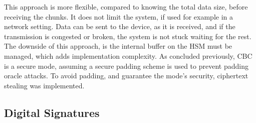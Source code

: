 This approach is more flexible, compared to knowing the total data size, before receiving the chunks. It does not limit the system, if used for example in a network setting. Data can be sent to the device, as it is received, and if the transmission is congested or broken, the system is not stuck waiting for the rest. The downside of this approach, is the internal buffer on the HSM must be managed, which adds implementation complexity.
As concluded previously, CBC is a secure mode, assuming a secure padding scheme is used to prevent padding oracle attacks. To avoid padding, and guarantee the mode's security, ciphertext stealing was implemented.






\subsection{Digital Signatures}\label{chap:implementation:services:signatures}

